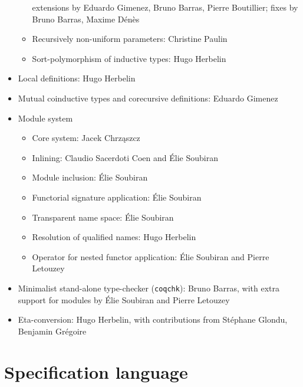 \documentclass{article}
\begin{document}
\begin{itemize}
\begin{itemize}
    extensions by Eduardo Gimenez, Bruno Barras, Pierre Boutillier; fixes by
    Bruno Barras, Maxime Dénès
  \item Recursively non-uniform parameters: Christine Paulin
  \item Sort-polymorphism of inductive types: Hugo Herbelin
  \end{itemize}
\item Local definitions: Hugo Herbelin
\item Mutual coinductive types and corecursive definitions: Eduardo Gimenez
\item Module system
  \begin{itemize}
  \item Core system: Jacek Chrz\k{a}szcz
  \item Inlining: Claudio Sacerdoti Coen and Élie Soubiran
  \item Module inclusion: Élie Soubiran
  \item Functorial signature application: Élie Soubiran
  \item Transparent name space: Élie Soubiran
  \item Resolution of qualified names: Hugo Herbelin
  \item Operator for nested functor application: Élie Soubiran and
    Pierre Letouzey
  \end{itemize}
\item Minimalist stand-alone type-checker (\texttt{coqchk}): Bruno Barras, with extra support for modules by Élie Soubiran and Pierre Letouzey
\item Eta-conversion: Hugo Herbelin, with contributions from Stéphane
  Glondu, Benjamin Grégoire
\end{itemize}

\section{Specification language}
\end{document}
